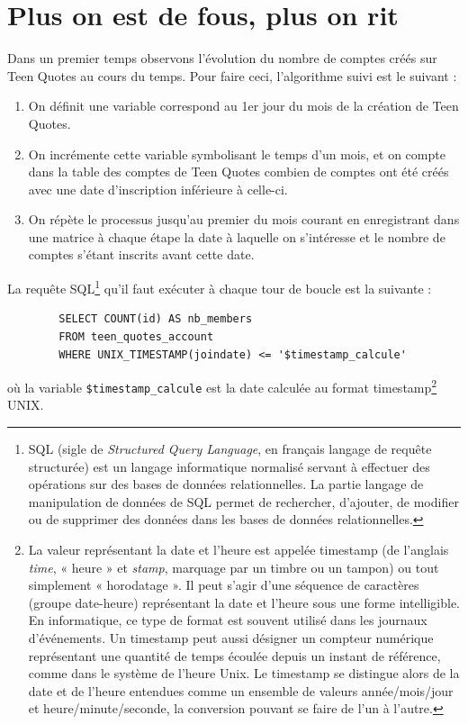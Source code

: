 \documentclass{report}
\begin{document}
	\section{Plus on est de fous, plus on rit}
	Dans un premier temps observons l'évolution du nombre de comptes créés sur Teen Quotes au cours du temps. Pour faire ceci, l'algorithme suivi est le suivant :
	\vspace{10px}
	\begin{enumerate}
		\item On définit une variable correspond au 1er jour du mois de la création de Teen Quotes.
		\item On incrémente cette variable symbolisant le temps d'un mois, et on compte dans la table des comptes de Teen Quotes combien de comptes ont été créés avec une date d'inscription inférieure à celle-ci.
		\item On répète le processus jusqu'au premier du mois courant en enregistrant dans une matrice à chaque étape la date à laquelle on s'intéresse et le nombre de comptes s'étant inscrits avant cette date. 
	\end{enumerate}
	\vspace{10px}
	La requête SQL\footnote{SQL (sigle de \textit{Structured Query Language}, en français langage de requête structurée) est un langage informatique normalisé servant à effectuer des opérations sur des bases de données relationnelles. La partie langage de manipulation de données de SQL permet de rechercher, d'ajouter, de modifier ou de supprimer des données dans les bases de données relationnelles.} qu'il faut exécuter à chaque tour de boucle est la suivante :
	\begin{lstlisting}
		SELECT COUNT(id) AS nb_members 
		FROM teen_quotes_account 
		WHERE UNIX_TIMESTAMP(joindate) <= '$timestamp_calcule'
	\end{lstlisting}
	où la variable \texttt{\$timestamp\_calcule} est la date calculée au format timestamp\footnote{La valeur représentant la date et l'heure est appelée timestamp (de l'anglais \textit{time}, « heure » et \textit{stamp}, marquage par un timbre ou un tampon) ou tout simplement « horodatage ». Il peut s'agir d'une séquence de caractères (groupe date-heure) représentant la date et l'heure sous une forme intelligible. En informatique, ce type de format est souvent utilisé dans les journaux d'événements. Un timestamp peut aussi désigner un compteur numérique représentant une quantité de temps écoulée depuis un instant de référence, comme dans le système de l'heure Unix. Le timestamp se distingue alors de la date et de l'heure entendues comme un ensemble de valeurs année/mois/jour et heure/minute/seconde, la conversion pouvant se faire de l'un à l'autre.} UNIX.
\end{document}

